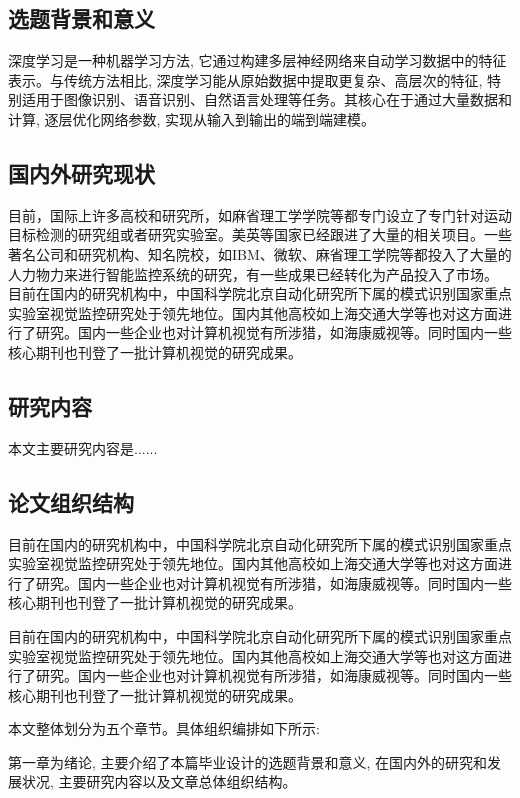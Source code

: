 \documentclass[UTF8, twoside]{ctexart}
\begin{document}
\subsection{选题背景和意义}
深度学习是一种机器学习方法, 它通过构建多层神经网络来自动学习数据中的特征表示\cite{LeCun2015}。与传统方法相比, 深度学习能从原始数据中提取更复杂、高层次的特征, 特别适用于图像识别、语音识别、自然语言处理等任务\cite{alexnet, hinton2012deep}。其核心在于通过大量数据和计算, 逐层优化网络参数, 实现从输入到输出的端到端建模\cite{LeCun2015}。

\subsection{国内外研究现状}
目前，国际上许多高校和研究所，如麻省理工学学院等都专门设立了专门针对运动目标检测的研究组或者研究实验室。美英等国家已经跟进了大量的相关项目。一些著名公司和研究机构、知名院校，如IBM、微软、麻省理工学院等都投入了大量的人力物力来进行智能监控系统的研究，有一些成果已经转化为产品投入了市场。
目前在国内的研究机构中，中国科学院北京自动化研究所下属的模式识别国家重点实验室视觉监控研究处于领先地位。国内其他高校如上海交通大学等也对这方面进行了研究。国内一些企业也对计算机视觉有所涉猎，如海康威视等。同时国内一些核心期刊也刊登了一批计算机视觉的研究成果。

\subsection{研究内容}
本文主要研究内容是......

\subsection{论文组织结构}
目前在国内的研究机构中，中国科学院北京自动化研究所下属的模式识别国家重点实验室视觉监控研究处于领先地位。国内其他高校如上海交通大学等也对这方面进行了研究。国内一些企业也对计算机视觉有所涉猎，如海康威视等。同时国内一些核心期刊也刊登了一批计算机视觉的研究成果。

目前在国内的研究机构中，中国科学院北京自动化研究所下属的模式识别国家重点实验室视觉监控研究处于领先地位。国内其他高校如上海交通大学等也对这方面进行了研究。国内一些企业也对计算机视觉有所涉猎，如海康威视等。同时国内一些核心期刊也刊登了一批计算机视觉的研究成果。

本文整体划分为五个章节。具体组织编排如下所示:

第一章为绪论, 主要介绍了本篇毕业设计的选题背景和意义, 在国内外的研究和发展状况, 主要研究内容以及文章总体组织结构。
\end{document}
